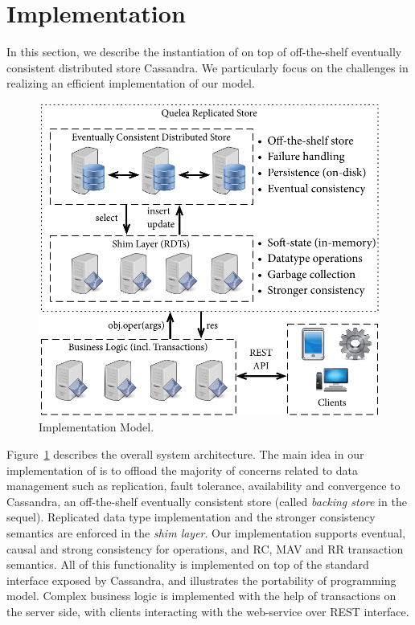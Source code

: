 \section{Implementation}

In this section, we describe the instantiation of \name on top of off-the-shelf
eventually consistent distributed store Cassandra. We particularly focus on the
challenges in realizing an efficient implementation of our model.

\begin{figure}
\begin{center}
\includegraphics[width=0.9\columnwidth]{Figures/ImplModel}
\end{center}
\caption{Implementation Model.}
\label{fig:impl_mod}
\end{figure}

Figure~\ref{fig:impl_mod} describes the overall system architecture. The main
idea in our implementation of \name is to offload the majority of concerns
related to data management such as replication, fault tolerance, availability
and convergence to Cassandra, an off-the-shelf eventually consistent store
(called \emph{backing store} in the sequel). Replicated data type
implementation and the stronger consistency semantics are enforced in the
\emph{shim layer}. Our implementation supports eventual, causal and strong
consistency for operations, and RC, MAV and RR transaction semantics. All of
this functionality is implemented on top of the standard interface exposed by
Cassandra, and illustrates the portability of \name programming model. Complex
business logic is implemented with the help of transactions on the server side,
with clients interacting with the web-service over REST interface.

